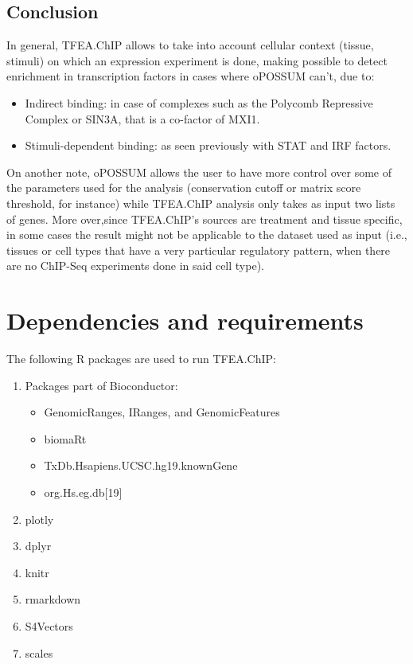 \documentclass[a4paper, 12pt ]{article}
\begin{document}
\subsection*{Conclusion}
In general, TFEA.ChIP allows to take into account cellular context (tissue, stimuli) on which an expression experiment is done, making possible to detect enrichment in transcription factors in cases where oPOSSUM can’t, due to:
\begin{itemize}
	\item Indirect binding: in case of complexes such as the Polycomb Repressive Complex or SIN3A, that is a co-factor of MXI1.
	\item Stimuli-dependent binding: as seen previously with STAT and IRF factors.
\end{itemize}


On another note, oPOSSUM allows the user to have more control over some of the parameters used for the analysis (conservation cutoff or matrix score threshold, for instance) while TFEA.ChIP analysis only takes as input two lists of genes. More over,since TFEA.ChIP’s sources are treatment and tissue specific, in some cases the result
might not be applicable to the dataset used as input (i.e., tissues or cell types that have a very particular regulatory pattern, when there are no ChIP-Seq experiments done in said cell type).

\section{Dependencies and requirements}
The following R packages are used to run TFEA.ChIP:
\begin{enumerate} \itemsep-0.5em
	
	\item Packages part of Bioconductor\cite{bioconductor}:
	\begin{itemize} \itemsep-0.5em
		\item GenomicRanges, IRanges, and GenomicFeatures\cite{GRanges}
		\item biomaRt\cite{biomart1}\cite{biomart2}
		\item TxDb.Hsapiens.UCSC.hg19.knownGene\cite{TxDb.knownGene}
		\item org.Hs.eg.db[19]
	\end{itemize}

	\setcounter{enumi}{4}
	\item plotly\cite{plotly}
	\item dplyr\cite{dplyr}
	\item knitr\cite{knitr}
	\item rmarkdown\cite{rmarkdown}
	\item S4Vectors\cite{S4Vectors}
	\item scales\cite{scales}
\end{enumerate}





\listoftodos
\end{document}
